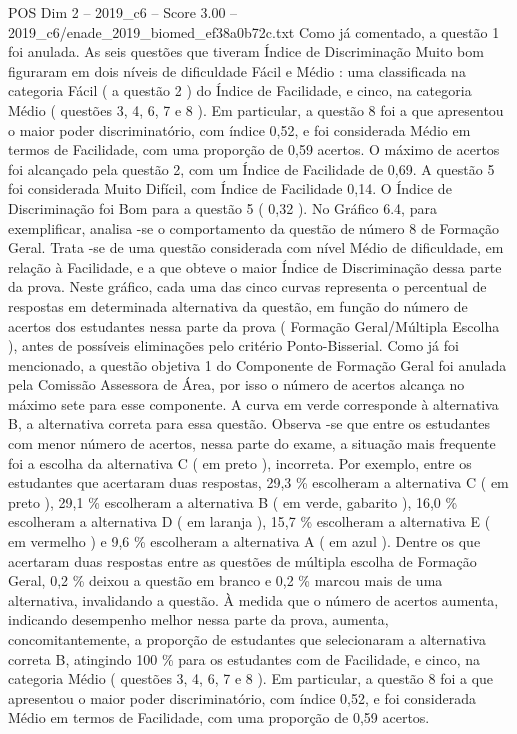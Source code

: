 \begin{textsample}{POS Dim 2 – 2019\_c6 – Score 3.00 – 2019\_c6/enade\_2019\_biomed\_ef38a0b72c.txt}
Como já comentado, a questão 1 foi anulada.
As seis questões que tiveram Índice de Discriminação Muito bom figuraram em dois níveis de dificuldade Fácil e Médio : uma classificada na categoria Fácil ( a questão 2 ) do Índice de Facilidade, e cinco, na categoria Médio ( questões 3, 4, 6, 7 e 8 ).
Em particular, a questão 8 foi a que apresentou o maior poder discriminatório, com índice 0,52, e foi considerada Médio em termos de Facilidade, com uma proporção de 0,59 acertos.
O máximo de acertos foi alcançado pela questão 2, com um Índice de Facilidade de 0,69.
A questão 5 foi considerada Muito Difícil, com Índice de Facilidade 0,14.
O Índice de Discriminação foi Bom para a questão 5 ( 0,32 ).
No Gráfico 6.4, para exemplificar, analisa -se o comportamento da questão de número 8 de Formação Geral.
Trata -se de uma questão considerada com nível Médio de dificuldade, em relação à Facilidade, e a que obteve o maior Índice de Discriminação dessa parte da prova.
Neste gráfico, cada uma das cinco curvas representa o percentual de respostas em determinada alternativa da questão, em função do número de acertos dos estudantes nessa parte da prova ( Formação Geral/Múltipla Escolha ), antes de possíveis eliminações pelo critério Ponto-Bisserial.
Como já foi mencionado, a questão objetiva 1 do Componente de Formação Geral foi anulada pela Comissão Assessora de Área, por isso o número de acertos alcança no máximo sete para esse componente.
A curva em verde corresponde à alternativa B, a alternativa correta para essa questão.
Observa -se que entre os estudantes com menor número de acertos, nessa parte do exame, a situação mais frequente foi a escolha da alternativa C ( em preto ), incorreta.
Por exemplo, entre os estudantes que acertaram duas respostas, 29,3 \% escolheram a alternativa C ( em preto ), 29,1 \% escolheram a alternativa B ( em verde, gabarito ), 16,0 \% escolheram a alternativa D ( em laranja ), 15,7 \% escolheram a alternativa E ( em vermelho ) e 9,6 \% escolheram a alternativa A ( em azul ).
Dentre os que acertaram duas respostas entre as questões de múltipla escolha de Formação Geral, 0,2 \% deixou a questão em branco e 0,2 \% marcou mais de uma alternativa, invalidando a questão.
À medida que o número de acertos aumenta, indicando desempenho melhor nessa parte da prova, aumenta, concomitantemente, a proporção de estudantes que selecionaram a alternativa correta B, atingindo 100 \% para os estudantes com de Facilidade, e cinco, na categoria Médio ( questões 3, 4, 6, 7 e 8 ).
Em particular, a questão 8 foi a que apresentou o maior poder discriminatório, com índice 0,52, e foi considerada Médio em termos de Facilidade, com uma proporção de 0,59 acertos.

\end{textsample}
